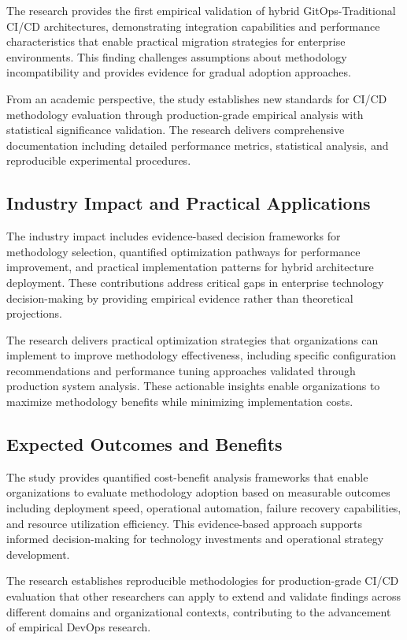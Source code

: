 The research provides the first empirical validation of hybrid GitOps-Traditional CI/CD architectures, demonstrating integration capabilities and performance characteristics that enable practical migration strategies for enterprise environments. This finding challenges assumptions about methodology incompatibility and provides evidence for gradual adoption approaches.

From an academic perspective, the study establishes new standards for CI/CD methodology evaluation through production-grade empirical analysis with statistical significance validation. The research delivers comprehensive documentation including detailed performance metrics, statistical analysis, and reproducible experimental procedures.

\subsection{Industry Impact and Practical Applications}
The industry impact includes evidence-based decision frameworks for methodology selection, quantified optimization pathways for performance improvement, and practical implementation patterns for hybrid architecture deployment. These contributions address critical gaps in enterprise technology decision-making by providing empirical evidence rather than theoretical projections.

The research delivers practical optimization strategies that organizations can implement to improve methodology effectiveness, including specific configuration recommendations and performance tuning approaches validated through production system analysis. These actionable insights enable organizations to maximize methodology benefits while minimizing implementation costs.

\subsection{Expected Outcomes and Benefits}
The study provides quantified cost-benefit analysis frameworks that enable organizations to evaluate methodology adoption based on measurable outcomes including deployment speed, operational automation, failure recovery capabilities, and resource utilization efficiency. This evidence-based approach supports informed decision-making for technology investments and operational strategy development.

The research establishes reproducible methodologies for production-grade CI/CD evaluation that other researchers can apply to extend and validate findings across different domains and organizational contexts, contributing to the advancement of empirical DevOps research.

